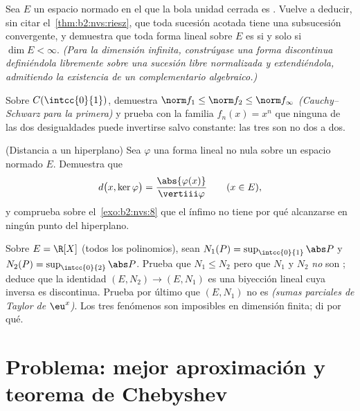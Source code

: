 \begin{exercise}[$\star\star\star$]\label{exo:b2:nvs:9}
Sea $E$ un espacio normado en el que la bola unidad cerrada es
. Vuelve a deducir, sin citar el~\cref{thm:b2:nvs:riesz}, que toda sucesión acotada tiene una
subsucesión convergente, y demuestra que toda forma lineal sobre $E$
es  si y solo si $\dim E < \infty$. \emph{(Para la
dimensión infinita, constrúyase una forma discontinua definiéndola
libremente sobre una sucesión libre normalizada y extendiéndola,
admitiendo la existencia de un complementario algebraico.)}
\end{exercise}

\begin{exercise}[$\star\star$]\label{exo:b2:nvs:10}
Sobre $C(\intcc{0}{1})$, demuestra $\norm f_1 \leq \norm f_2 \leq
\norm f_\infty$ \emph{(Cauchy--Schwarz para la primera)} y prueba
con la familia $f_n(x) = x^n$ que ninguna de las dos desigualdades
puede invertirse salvo constante: las tres  son
no  dos a dos.
\end{exercise}

\begin{exercise}[$\star\star$]\label{exo:b2:nvs:11}
(Distancia a un hiperplano) Sea $\varphi$ una forma lineal
 no nula sobre un espacio normado $E$. Demuestra que
\[
d\bigl(x, \ker\varphi\bigr) =
\frac{\abs{\varphi(x)}}{\vertiii\varphi}
\qquad (x \in E),
\]
y comprueba sobre el~\cref{exo:b2:nvs:8} que el ínfimo no tiene por
qué alcanzarse en ningún punto del hiperplano.
\end{exercise}

\begin{exercise}[$\star\star\star$]\label{exo:b2:nvs:12}
Sobre $E = \R[X]$ (todos los polinomios), sean $N_1(P) =
\sup_{\intcc{0}{1}}\abs P$ y $N_2(P) = \sup_{\intcc{0}{2}}\abs P$.
Prueba que $N_1 \leq N_2$ pero que $N_1$ y $N_2$ \emph{no} son
; deduce que la identidad $(E, N_2) \to (E, N_1)$ es
una biyección lineal  cuya inversa es discontinua. Prueba
por último que $(E, N_1)$ no es  \emph{(sumas parciales de
Taylor de $\eu^x$)}. Los tres fenómenos son imposibles en dimensión
finita; di por qué.
\end{exercise}

\section{Problema: mejor aproximación y teorema de Chebyshev}

